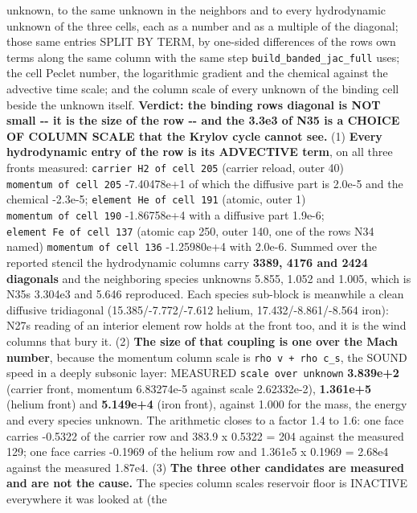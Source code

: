 \documentclass[english,a4paper]{my_memo}
\begin{document}
\begin{itemize}
  unknown, to the same unknown in the neighbors and to every hydrodynamic
  unknown of the three cells, each as a number and as a multiple of the
  diagonal; those same entries SPLIT BY TERM, by one-sided differences of
  the row\textquotesingle s own terms along the same column with the same step
  \texttt{build\_banded\_jac\_full} uses; the cell Peclet number, the logarithmic
  gradient and the chemical against the advective time scale; and the column
  scale of every unknown of the binding cell beside the unknown itself.
  \textbf{Verdict: the binding row\textquotesingle s diagonal is NOT small -\/- it is the size of the
  row -\/- and the 3.3e3 of N35 is a CHOICE OF COLUMN SCALE that the Krylov
  cycle cannot see.} (1) \textbf{Every hydrodynamic entry of the row is its
  ADVECTIVE term}, on all three fronts measured: \texttt{carrier\ H2\ of\ cell\ 205}
  (carrier reload, outer 40) \texttt{momentum\ of\ cell\ 205} -7.40478e+1 of which the
  diffusive part is 2.0e-5 and the chemical -2.3e-5; \texttt{element\ He\ of\ cell\ 191}
  (atomic, outer 1) \texttt{momentum\ of\ cell\ 190} -1.86758e+4 with a diffusive part
  1.9e-6; \texttt{element\ Fe\ of\ cell\ 137} (atomic cap 250, outer 140, one of the
  rows N34 named) \texttt{momentum\ of\ cell\ 136} -1.25980e+4 with 2.0e-6. Summed
  over the reported stencil the hydrodynamic columns carry \textbf{3389, 4176 and
  2424 diagonals} and the neighboring species unknowns 5.855, 1.052 and
  1.005, which is N35\textquotesingle s 3.304e3 and 5.646 reproduced. Each species
  sub-block is meanwhile a clean diffusive tridiagonal (15.385/-7.772/-7.612
  helium, 17.432/-8.861/-8.564 iron): N27\textquotesingle s reading of an interior element
  row holds at the front too, and it is the wind columns that bury it. (2)
  \textbf{The size of that coupling is one over the Mach number}, because the
  momentum column scale is \texttt{\textbar{}rho\ v\textbar{}\ +\ rho\ c\_s}, the SOUND speed in a deeply
  subsonic layer: MEASURED \texttt{scale\ over\ unknown} \textbf{3.839e+2} (carrier front,
  momentum 6.83274e-5 against scale 2.62332e-2), \textbf{1.361e+5} (helium front)
  and \textbf{5.149e+4} (iron front), against 1.000 for the mass, the energy and
  every species unknown. The arithmetic closes to a factor 1.4 to 1.6: one
  face carries -0.5322 of the carrier row and 383.9 x 0.5322 = 204 against
  the measured 129; one face carries -0.1969 of the helium row and
  1.361e5 x 0.1969 = 2.68e4 against the measured 1.87e4. (3) \textbf{The three
  other candidates are measured and are not the cause.} The species column
  scale\textquotesingle s reservoir floor is INACTIVE everywhere it was looked at (the

\end{itemize}
\end{document}
